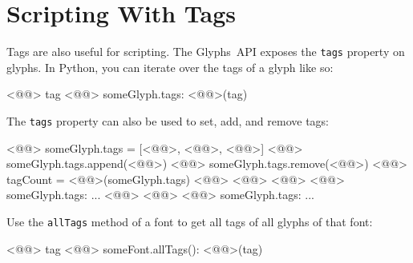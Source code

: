 \medbreak\noindent{}

\section{Scripting With Tags}%
\label{sec:scripting_with_tags}

Tags are also useful for scripting.
The Glyphs~API exposes the \texttt{tags} property on glyphs.
In Python, you can iterate over the tags of a glyph like so:

\begin{RichListing}
<@@> tag <@@> someGlyph.tags:
    <@@>(tag)
\end{RichListing}

\medbreak\noindent{}

\bigbreak\noindent The \texttt{tags} property can also be used to set, add, and remove tags:

\begin{RichListing}
<@@>
someGlyph.tags = [<@@>, <@@>, <@@>]
<@@>
someGlyph.tags.append(<@@>)
<@@>
someGlyph.tags.remove(<@@>)
<@@>
tagCount = <@@>(someGlyph.tags)
<@@>
<@@> <@@> <@@> someGlyph.tags:
    ...
<@@> <@@> <@@> someGlyph.tags:
    ...
\end{RichListing}

\noindent Use the \texttt{allTags} method of a font to get all tags of all glyphs of that font:

\begin{RichListing}
<@@> tag <@@> someFont.allTags():
    <@@>(tag)
\end{RichListing}
